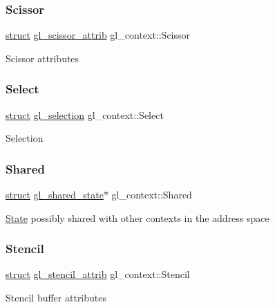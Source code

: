 \subsubsection{\texorpdfstring{Scissor}{Scissor}}
{\footnotesize\ttfamily \hyperlink{interfacestruct}{struct} \hyperlink{structgl__scissor__attrib}{gl\+\_\+scissor\+\_\+attrib} gl\+\_\+context\+::\+Scissor}

Scissor attributes \mbox{\label{structgl__context_aef69cddd9306ad3101ee239a5c9b76e1}} 
\subsubsection{\texorpdfstring{Select}{Select}}
{\footnotesize\ttfamily \hyperlink{interfacestruct}{struct} \hyperlink{structgl__selection}{gl\+\_\+selection} gl\+\_\+context\+::\+Select}

Selection \mbox{\label{structgl__context_a902136f9a479ad001efa6a095eed7ebf}} 
\subsubsection{\texorpdfstring{Shared}{Shared}}
{\footnotesize\ttfamily \hyperlink{interfacestruct}{struct} \hyperlink{structgl__shared__state}{gl\+\_\+shared\+\_\+state}$\ast$ gl\+\_\+context\+::\+Shared}

\hyperlink{struct_state}{State} possibly shared with other contexts in the address space \mbox{\label{structgl__context_a95a893f6eb0f3b7a23d89db3b0a75c41}} 
\subsubsection{\texorpdfstring{Stencil}{Stencil}}
{\footnotesize\ttfamily \hyperlink{interfacestruct}{struct} \hyperlink{structgl__stencil__attrib}{gl\+\_\+stencil\+\_\+attrib} gl\+\_\+context\+::\+Stencil}

Stencil buffer attributes \mbox{\label{structgl__context_aa3788eb53856dc78776e2ac6fb471804}} 
